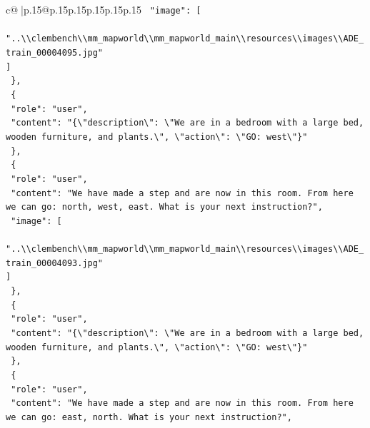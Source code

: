 \documentclass{article}
\begin{document}
{\begin{supertabular}{c@{$\;$}|p{.15\linewidth}@{}p{.15\linewidth}p{.15\linewidth}p{.15\linewidth}p{.15\linewidth}p{.15\linewidth}}
{{{\texttt{    "image": {[}} \\
\texttt{      "..\textbackslash{}\textbackslash{}clembench\textbackslash{}\textbackslash{}mm\_mapworld\textbackslash{}\textbackslash{}mm\_mapworld\_main\textbackslash{}\textbackslash{}resources\textbackslash{}\textbackslash{}images\textbackslash{}\textbackslash{}ADE\_train\_00004095.jpg"} \\
\texttt{    {]}} \\
\texttt{  \},} \\
\texttt{  \{} \\
\texttt{    "role": "user",} \\
\texttt{    "content": "\{\textbackslash{}"description\textbackslash{}": \textbackslash{}"We are in a bedroom with a large bed, wooden furniture, and plants.\textbackslash{}", \textbackslash{}"action\textbackslash{}": \textbackslash{}"GO: west\textbackslash{}"\}"} \\
\texttt{  \},} \\
\texttt{  \{} \\
\texttt{    "role": "user",} \\
\texttt{    "content": "We have made a step and are now in this room. From here we can go: north, west, east. What is your next instruction?",} \\
\texttt{    "image": {[}} \\
\texttt{      "..\textbackslash{}\textbackslash{}clembench\textbackslash{}\textbackslash{}mm\_mapworld\textbackslash{}\textbackslash{}mm\_mapworld\_main\textbackslash{}\textbackslash{}resources\textbackslash{}\textbackslash{}images\textbackslash{}\textbackslash{}ADE\_train\_00004093.jpg"} \\
\texttt{    {]}} \\
\texttt{  \},} \\
\texttt{  \{} \\
\texttt{    "role": "user",} \\
\texttt{    "content": "\{\textbackslash{}"description\textbackslash{}": \textbackslash{}"We are in a bedroom with a large bed, wooden furniture, and plants.\textbackslash{}", \textbackslash{}"action\textbackslash{}": \textbackslash{}"GO: west\textbackslash{}"\}"} \\
\texttt{  \},} \\
\texttt{  \{} \\
\texttt{    "role": "user",} \\
\texttt{    "content": "We have made a step and are now in this room. From here we can go: east, north. What is your next instruction?",} \\
}}}
\end{supertabular}}
\end{document}
